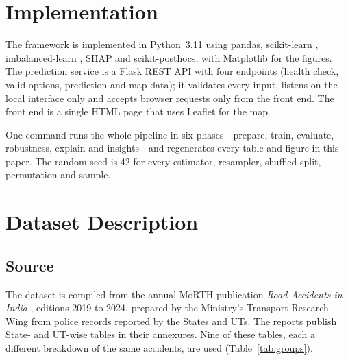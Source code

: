 \documentclass[conference]{IEEEtran}
\begin{document}
\section{Implementation}
\label{sec:implementation}

The framework is implemented in Python~3.11 using pandas, scikit-learn \cite{pedregosa2011}, imbalanced-learn \cite{lemaitre2017}, SHAP \cite{lundberg2017} and scikit-posthocs, with Matplotlib for the figures. The prediction service is a Flask REST API with four endpoints (health check, valid options, prediction and map data); it validates every input, listens on the local interface only and accepts browser requests only from the front end. The front end is a single HTML page that uses Leaflet for the map.

One command runs the whole pipeline in six phases---prepare, train, evaluate, robustness, explain and insights---and regenerates every table and figure in this paper. The random seed is 42 for every estimator, resampler, shuffled split, permutation and sample.

\section{Dataset Description}
\label{sec:dataset}

\subsection{Source}
The dataset is compiled from the annual MoRTH publication \emph{Road Accidents in India} \cite{morth2022,morthseries}, editions 2019 to 2024, prepared by the Ministry's Transport Research Wing from police records reported by the States and UTs. The reports publish State- and UT-wise tables in their annexures. Nine of these tables, each a different breakdown of the same accidents, are used (Table~\ref{tab:groups}).
\end{document}
